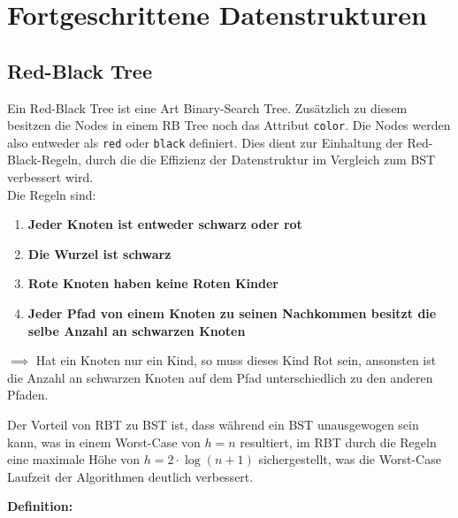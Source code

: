 \documentclass[
../AuD-Zusammenfassung.tex,
]
{subfiles}
\begin{document}
\section{Fortgeschrittene Datenstrukturen}
\subsection{Red-Black Tree}
Ein Red-Black Tree ist eine Art Binary-Search Tree. Zusätzlich zu diesem besitzen die Nodes in einem RB Tree noch das Attribut \texttt{color}. Die Nodes werden also entweder als \texttt{red} oder \texttt{black} definiert. Dies dient zur Einhaltung der Red-Black-Regeln, durch die die Effizienz der Datenstruktur im Vergleich zum BST verbessert wird.\\
Die Regeln sind:
\begin{enumerate}
    \item \textbf{Jeder Knoten ist entweder schwarz oder rot}
    \item \textbf{Die Wurzel ist schwarz}
    \item \textbf{Rote Knoten haben keine Roten Kinder}
    \item \textbf{Jeder Pfad von einem Knoten zu seinen Nachkommen besitzt die selbe Anzahl an schwarzen Knoten}
\end{enumerate}
$\implies$ Hat ein Knoten nur ein Kind, so muss dieses Kind Rot sein, ansonsten ist die Anzahl an schwarzen Knoten auf dem Pfad unterschiedlich zu den anderen Pfaden.

Der Vorteil von RBT zu BST ist, dass während ein BST unausgewogen sein kann, was in einem Worst-Case von $h = n$ resultiert, im RBT durch die Regeln eine maximale Höhe von $h = 2\cdot \log (n + 1)$ sichergestellt, was die Worst-Case Laufzeit der Algorithmen deutlich verbessert.

\textbf{Definition:}

\begin{algorithm}[H]
        
\end{algorithm}
\end{document}

